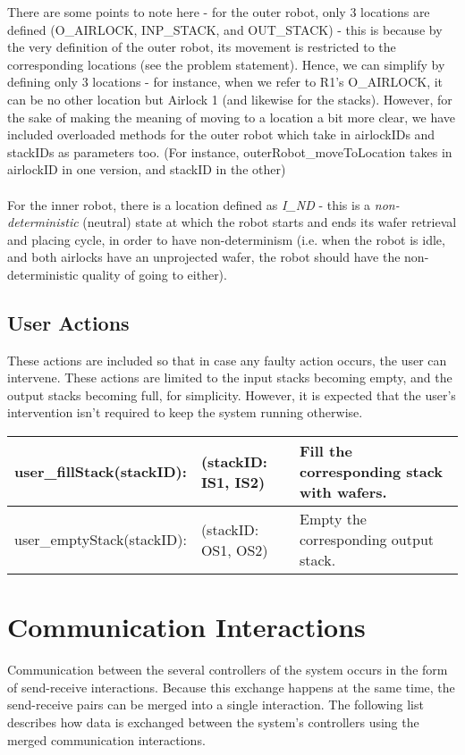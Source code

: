 There are some points to note here - for the outer robot, only 3 locations are defined (O\_AIRLOCK, INP\_STACK, and OUT\_STACK) - this is because by the very definition of the outer robot, its movement is restricted to the corresponding locations (see the problem statement). Hence, we can simplify by defining only 3 locations - for instance, when we refer to R1's O\_AIRLOCK, it can be no other location but Airlock 1 (and likewise for the stacks). However, for the sake of making the meaning of moving to a location a bit more clear, we have included overloaded methods for the outer robot which take in airlockIDs and stackIDs as parameters too. (For instance, outerRobot\_moveToLocation takes in airlockID in one version, and stackID in the other)\\\\
For the inner robot, there is a location defined as \textit{I_ND} - this is a \textit{non-deterministic} (neutral) state at which the robot starts and ends its wafer retrieval and placing cycle, in order to have non-determinism (i.e. when the robot is idle, and both airlocks have an unprojected wafer, the robot should have the non-deterministic quality of going to either).

\subsection{User Actions}

These actions are included so that in case any faulty action occurs, the user can intervene. These actions are limited to the input stacks becoming empty, and the output stacks becoming full, for simplicity. However, it is expected that the user's intervention isn't required to keep the system running otherwise.

\begin{longtable}{| p{4.3cm}| p{4.3cm}| p{4.3cm}|}
\hline
	user_fillStack(stackID): & (stackID: IS1, IS2) & Fill the corresponding stack with wafers. \\ \hline
	user_emptyStack(stackID): & (stackID: OS1, OS2) & Empty the corresponding output stack. \\ \hline
\end{longtable}

\section{Communication Interactions}
    Communication between the several controllers of the system occurs in the form of send-receive interactions. Because this exchange happens at the same time, the send-receive pairs can be merged into a single interaction. The following list describes how data is exchanged between the system's controllers using the merged communication interactions.


